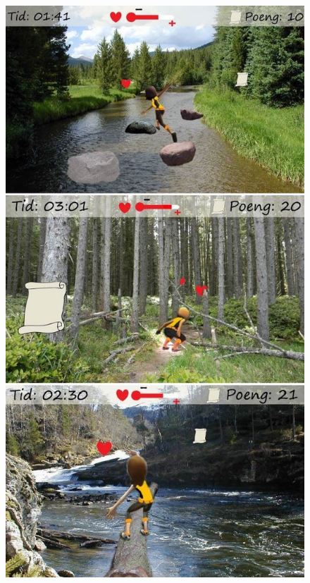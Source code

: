 \begin{figure} [H]
\centering
\includegraphics[scale=0.45]{hindring1.jpg}
\label{fig:hindring1Norsk}
\end{figure}

